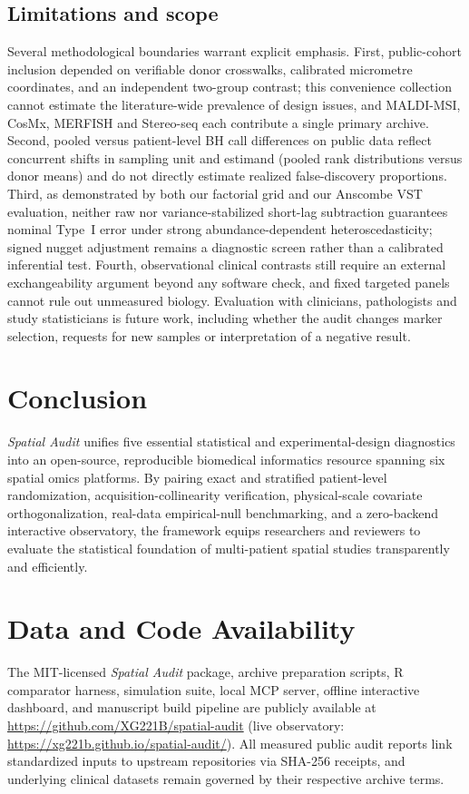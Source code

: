 \documentclass[11pt]{article}
\begin{document}
\subsection{Limitations and scope}
Several methodological boundaries warrant explicit emphasis. First, public-cohort inclusion depended on verifiable donor crosswalks, calibrated micrometre coordinates, and an independent two-group contrast; this convenience collection cannot estimate the literature-wide prevalence of design issues, and MALDI-MSI, CosMx, MERFISH and Stereo-seq each contribute a single primary archive. Second, pooled versus patient-level BH call differences on public data reflect concurrent shifts in sampling unit and estimand (pooled rank distributions versus donor means) and do not directly estimate realized false-discovery proportions. Third, as demonstrated by both our factorial grid and our Anscombe VST evaluation, neither raw nor variance-stabilized short-lag subtraction guarantees nominal Type~I error under strong abundance-dependent heteroscedasticity; signed nugget adjustment remains a diagnostic screen rather than a calibrated inferential test. Fourth, observational clinical contrasts still require an external exchangeability argument beyond any software check, and fixed targeted panels cannot rule out unmeasured biology. Evaluation with clinicians, pathologists and study statisticians is future work, including whether the audit changes marker selection, requests for new samples or interpretation of a negative result.

\section{Conclusion}
\textit{Spatial Audit} unifies five essential statistical and experimental-design diagnostics into an open-source, reproducible biomedical informatics resource spanning six spatial omics platforms. By pairing exact and stratified patient-level randomization, acquisition-collinearity verification, physical-scale covariate orthogonalization, real-data empirical-null benchmarking, and a zero-backend interactive observatory, the framework equips researchers and reviewers to evaluate the statistical foundation of multi-patient spatial studies transparently and efficiently.

\section*{Data and Code Availability}
The MIT-licensed \textit{Spatial Audit} package, archive preparation scripts, R comparator harness, simulation suite, local MCP server, offline interactive dashboard, and manuscript build pipeline are publicly available at \url{https://github.com/XG221B/spatial-audit} (live observatory: \url{https://xg221b.github.io/spatial-audit/}). All measured public audit reports link standardized inputs to upstream repositories via SHA-256 receipts, and underlying clinical datasets remain governed by their respective archive terms.
\end{document}
